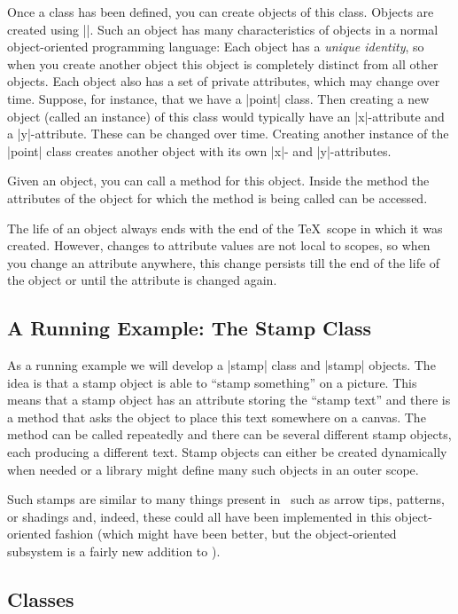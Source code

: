 Once a class has been defined, you can create objects of this
class. Objects are created using |\pgfoonew|. Such an object has many
characteristics of objects in a normal object-oriented programming
language: Each object has a \emph{unique identity}, so when you create
another object this object is completely distinct from all other
objects. Each object also has a set of private attributes, which may
change over time. Suppose, for instance, that we have a |point|
class. Then creating a new object (called an instance) of this class
would typically have an |x|-attribute and a |y|-attribute. These can
be changed over time. Creating another instance of the
|point| class creates another object with its own |x|- and
|y|-attributes.

Given an object, you can call a method for this object. Inside the
method the attributes of the object for which the method is being
called can be accessed.

The life of an object always ends with the end of the \TeX\ scope in
which it was created. However, changes to attribute values are not
local to scopes, so when you change an attribute anywhere, this change
persists till the end of the life of the object or until the attribute
is changed again.

\subsection{A Running Example: The Stamp Class}

As a running example we will develop a |stamp| class and |stamp|
objects. The idea is that a stamp object is able to ``stamp
something'' on a picture. This means that a stamp object has an
attribute storing the ``stamp text'' and there is a method that asks
the object to place this text somewhere on a
canvas. The method can be called repeatedly and there can be several
different stamp objects, each producing a different text. Stamp
objects can either be created dynamically when needed or a library
might define many such objects in an outer scope.

Such stamps are similar to many things present in \pgfname\ such as
arrow tips, patterns, or shadings and, indeed, these could all have
been implemented in this object-oriented fashion (which might have
been better, but the object-oriented subsystem is a fairly new
addition to \pgfname).


\subsection{Classes}

